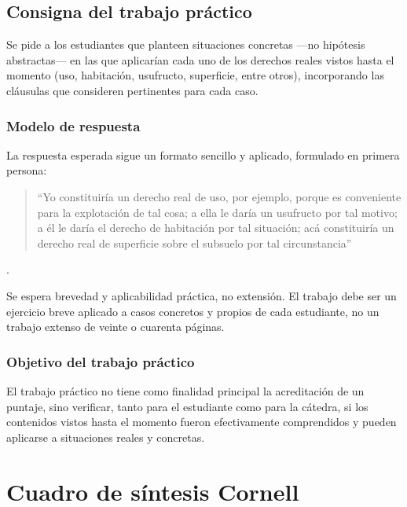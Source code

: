 \documentclass[12pt,oneside]{book}
\begin{document}
\section{Consigna del trabajo práctico}

Se pide a los estudiantes que planteen situaciones concretas ---no hipótesis abstractas--- en las que aplicarían cada uno de los derechos reales vistos hasta el momento (uso, habitación, usufructo, superficie, entre otros), incorporando las cláusulas que consideren pertinentes para cada caso.

\subsection{Modelo de respuesta}

La respuesta esperada sigue un formato sencillo y aplicado, formulado en primera persona:

\begin{quote}
``Yo constituiría un derecho real de uso, por ejemplo, porque es conveniente para la explotación de tal cosa; a ella le daría un usufructo por tal motivo; a él le daría el derecho de habitación por tal situación; acá constituiría un derecho real de superficie sobre el subsuelo por tal circunstancia''
\end{quote}.

Se espera brevedad y aplicabilidad práctica, no extensión. El trabajo debe ser un ejercicio breve aplicado a casos concretos y propios de cada estudiante, no un trabajo extenso de veinte o cuarenta páginas.

\subsection{Objetivo del trabajo práctico}

El trabajo práctico no tiene como finalidad principal la acreditación de un puntaje, sino verificar, tanto para el estudiante como para la cátedra, si los contenidos vistos hasta el momento fueron efectivamente comprendidos y pueden aplicarse a situaciones reales y concretas.


\chapter*{Cuadro de síntesis Cornell}
\end{document}
